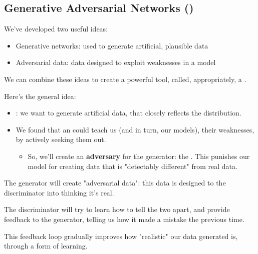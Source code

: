     \subsection{Generative Adversarial Networks ()}

        We've developed two useful ideas:

        \begin{itemize}
            \item Generative networks: used to generate artificial, plausible data
            \item Adversarial data: data designed to exploit weaknesses in a model
        \end{itemize}

        We can combine these ideas to create a powerful tool, called, appropriately, a .

        Here's the general idea:

        \begin{itemize}
            \item {}: we want to generate artificial data, that closely reflects the  distribution. 
            
            \item We found that an  could teach us (and in turn, our models), their weaknesses, by actively seeking them out.

            \begin{itemize}
                \item So, we'll create an \textbf{adversary} for the generator: the . This punishes our model for creating data that is "detectably different" from real data. 
            \end{itemize}
            
            
        \end{itemize}

        The generator will create "adversarial data": this data is designed to  the discriminator into thinking it's real.

        The discriminator will try to learn how to tell the two apart, and provide feedback to the generator, telling us how it made a mistake the previous time.

        This feedback loop gradually improves how "realistic" our data generated is, through a form of  learning.
            \\


